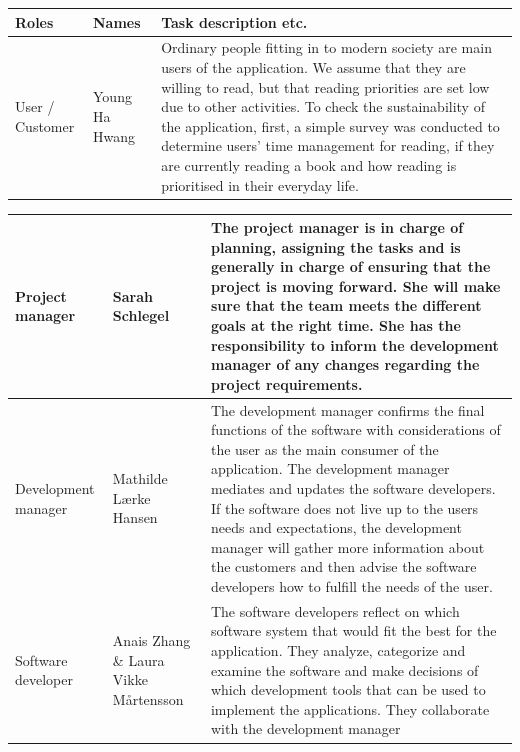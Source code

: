 \documentclass[conference]{IEEEtran}
\begin{document}
\begin{center}
\begin{tabular}{ | m{1.8cm} | m{1.5cm}| m{4.2cm} | } 
 \hline
 Roles & Names & Task description etc. \\ 
 \hline
 User / Customer  & Young Ha Hwang & Ordinary people fitting in to modern society are main users of the application. We assume that they are willing to read, but that reading priorities are set low due to other activities. To check the sustainability of the application, first, a simple survey was conducted to determine users' time management for reading, if they are currently reading a book and how reading is prioritised in their everyday life. \\ 
 \hline
\end{tabular}
\end{center}

\begin{center}
\begin{tabular}{ | m{1.8cm} | m{1.5cm}| m{4.2cm} | } 

 \hline
 Project manager & Sarah Schlegel & The project manager is in charge of planning, assigning the tasks and is generally in charge of ensuring that the project is moving forward. She will make sure that the team meets the different goals at the right time. She has the responsibility to inform the development manager of any changes regarding the project requirements. \\
  \hline
  Development manager &  Mathilde Lærke Hansen & The development manager confirms the final functions of the software with considerations of the user as the main consumer of the application. The development manager mediates and updates the software developers. If the software does not live up to the users needs and expectations, the development manager will gather more information about the customers and then advise the software developers how to fulfill the needs of the user.\\
  \hline
 Software developer & Anais Zhang \&  Laura Vikke Mårtensson & The software developers reflect on which software system that would fit the best for the application. They analyze, categorize and examine the software and make decisions of which development tools that can be used to implement the applications. They collaborate with the development manager \\ 
 \hline
\end{tabular}
\end{center}
\end{document}
